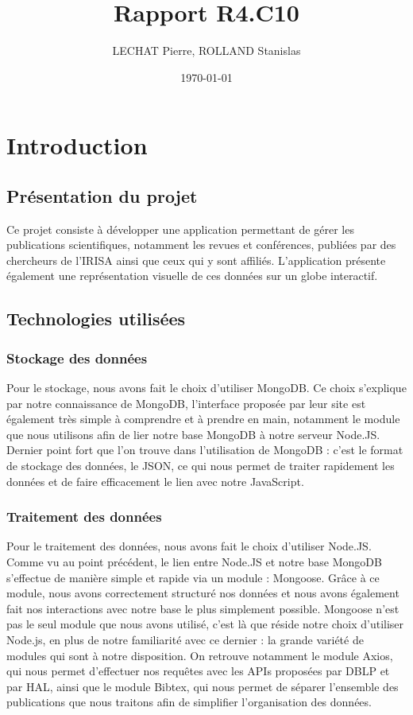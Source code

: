 \documentclass[a4paper,12pt]{article}
\title{Rapport R4.C10} %
\author{LECHAT Pierre, ROLLAND Stanislas}
\date{\today}
\begin{document}
\maketitle  
\tableofcontents  
\newpage          


\section{Introduction}

\subsection{Présentation du projet}
Ce projet consiste à développer une application permettant de gérer les publications scientifiques, notamment les revues et conférences, publiées par des chercheurs de l'IRISA ainsi que ceux qui y sont affiliés. L'application présente 
également une représentation visuelle de ces données sur un globe interactif.

\subsection{Technologies utilisées}

\subsubsection{Stockage des données}
Pour le stockage, nous avons fait le choix d'utiliser MongoDB. Ce choix s'explique par notre connaissance de MongoDB, l'interface proposée par leur site est également très simple à comprendre et à prendre en main, notamment le module que nous 
utilisons afin de lier notre base MongoDB à notre serveur Node.JS. Dernier point fort que l'on trouve dans l'utilisation de MongoDB : c'est le format de stockage des données, le JSON, ce qui nous permet de traiter rapidement les données et de faire 
efficacement le lien avec notre JavaScript.

\subsubsection{Traitement des données}
Pour le traitement des données, nous avons fait le choix d'utiliser Node.JS. Comme vu au point précédent, le lien entre Node.JS et notre base MongoDB s'effectue de manière simple et rapide via un module : Mongoose. Grâce à ce module, nous avons correctement
structuré nos données et nous avons également fait nos interactions avec notre base le plus simplement possible. Mongoose n'est pas le seul module que nous avons utilisé, c'est là que réside notre choix d'utiliser Node.js, en plus de notre familiarité avec ce dernier : la grande variété de modules qui 
sont à notre disposition. On retrouve notamment le module Axios, qui nous permet d'effectuer nos requêtes avec les APIs proposées par DBLP et par HAL, ainsi que le module Bibtex, qui nous permet de séparer l'ensemble des publications que nous traitons afin de simplifier l'organisation des données.
\end{document}
